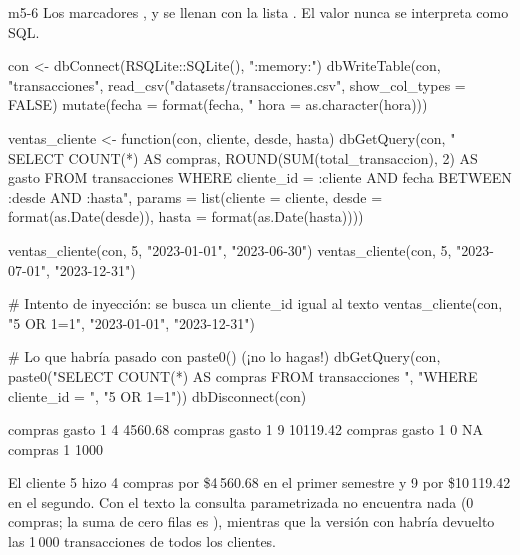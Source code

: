 \begin{solucion}{m5-6}
Los marcadores ,  y  se
llenan con la lista . El valor nunca se interpreta como
SQL.

\begin{rcode}
con <- dbConnect(RSQLite::SQLite(), ":memory:")
dbWriteTable(con, "transacciones",
             read_csv("datasets/transacciones.csv",
                      show_col_types = FALSE) %
               mutate(fecha = format(fecha, "%
                      hora = as.character(hora)))

ventas_cliente <- function(con, cliente, desde, hasta) {
  dbGetQuery(con, "
    SELECT COUNT(*)                         AS compras,
           ROUND(SUM(total_transaccion), 2) AS gasto
    FROM transacciones
    WHERE cliente_id = :cliente
      AND fecha BETWEEN :desde AND :hasta",
    params = list(cliente = cliente,
                  desde   = format(as.Date(desde)),
                  hasta   = format(as.Date(hasta))))
}

ventas_cliente(con, 5, "2023-01-01", "2023-06-30")
ventas_cliente(con, 5, "2023-07-01", "2023-12-31")

# Intento de inyección: se busca un cliente_id igual al texto
ventas_cliente(con, "5 OR 1=1", "2023-01-01", "2023-12-31")

# Lo que habría pasado con paste0() (¡no lo hagas!)
dbGetQuery(con, paste0("SELECT COUNT(*) AS compras FROM transacciones ",
                       "WHERE cliente_id = ", "5 OR 1=1"))
dbDisconnect(con)
\end{rcode}

\begin{rsalida}
  compras   gasto
1       4 4560.68
  compras    gasto
1       9 10119.42
  compras gasto
1       0    NA
  compras
1    1000
\end{rsalida}

El cliente 5 hizo 4 compras por \$4\,560.68 en el primer semestre y 9 por
\$10\,119.42 en el segundo. Con el texto  la consulta
parametrizada no encuentra nada (0 compras; la suma de cero filas es
), mientras que la versión con  habría
devuelto las 1\,000 transacciones de todos los clientes.
\end{solucion}

